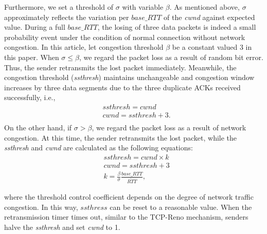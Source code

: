 \documentclass[draftclsnofoot,onecolumn,11pt]{IEEEtran}
\begin{document}
Furthermore, we set a threshold of $\sigma$ with variable $\beta$. As mentioned above, $\sigma$ approximately reflects the variation per $base\_RTT$ of the \emph{cwnd} against expected value. During a full $base\_RTT$, the losing of three data packets is indeed a small probability event under the condition of normal connection without network congestion. In this article, let congestion threshold $\beta$ be a constant valued 3 in this paper.
When $\sigma\leq\beta$, we regard the packet loss as a result of random bit error. Thus, the sender retransmits the lost packet immediately. Meanwhile, the congestion threshold (\emph{ssthresh}) maintains unchangeable and congestion window increases by three data segments due to the three duplicate ACKs received successfully, i.e.,
  \begin{equation}\label{4}
   \begin{aligned}
&ssthresh=cwnd \\
&cwnd=ssthresh+3.\\
   \end{aligned}
  \end{equation}
On the other hand, if $\sigma>\beta$, we regard the packet loss as a result of network congestion. At this time, the sender retransmits the lost packet, while the \emph{ssthresh} and \emph{cwnd} are calculated as the following equations:
\begin{equation}\label{5}
   \begin{aligned}
&ssthresh=cwnd\times k \\
&cwnd=ssthresh+3 \\
&k=\frac{\beta}{\sigma}\frac{base\_RTT}{\widetilde{RTT}},
   \end{aligned}
  \end{equation}

\noindent where the threshold control coefficient depends on the degree of network traffic congestion. In this way, $ssthress$ can be reset to a reasonable value.
When the retransmission timer times out, similar to the TCP-Reno mechanism, senders halve the \emph{ssthresh} and set \emph{cwnd} to 1.
\end{document}
